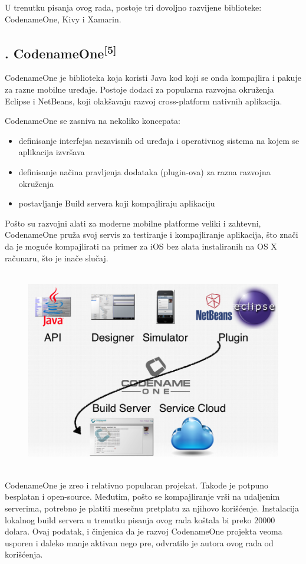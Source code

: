 \documentclass[a4paper]{article}
\newcommand\liststyleLii{%
\renewcommand\labelitemi{•}
\renewcommand\labelitemii{◦}
\renewcommand\labelitemiii{${\blacksquare}$}
\renewcommand\labelitemiv{•}
}
\begin{document}
U trenutku pisanja ovog rada, postoje tri dovoljno razvijene biblioteke:
CodenameOne, Kivy i Xamarin.

\subsection[3.1. CodenameOne[5{]}]{.
CodenameOne\textsuperscript{[5]}}
\hypertarget{RefHeadingToc1071308303690}{}CodenameOne je biblioteka koja
koristi Java kod koji se onda kompajlira i pakuje za razne mobilne
uređaje. Postoje dodaci za popularna razvojna okruženja Eclipse i
NetBeans, koji olakšavaju razvoj cross-platform nativnih aplikacija.

CodenameOne se zasniva na nekoliko koncepata:

\liststyleLii
\begin{itemize}
\item definisanje interfejsa nezavisnih od uređaja i operativnog sistema
na kojem se aplikacija izvršava
\item definisanje načina pravljenja dodataka (plugin-ova) za razna
razvojna okruženja
\item postavljanje Build servera koji kompajliraju aplikaciju
\end{itemize}
Pošto su razvojni alati za moderne mobilne platforme veliki i zahtevni,
CodenameOne pruža svoj servis za testiranje i kompajliranje aplikacija,
što znači da je moguće kompajlirati na primer za iOS bez alata
instaliranih na OS X računaru, što je inače slučaj.



\begin{figure}
\centering
\includegraphics[width=127.04mm,height=88.14mm]{msc-img8.png}
\end{figure}
\clearpage
CodenameOne je zreo i relativno popularan projekat. Takođe je potpuno
besplatan i open-source. Međutim, pošto se kompajliranje vrši na
udaljenim serverima, potrebno je platiti mesečnu pretplatu za njihovo
korišćenje. Instalacija lokalnog build servera u trenutku pisanja ovog
rada koštala bi preko 20000 dolara. Ovaj podatak, i činjenica da je
razvoj CodenameOne projekta veoma usporen i daleko manje aktivan nego
pre, odvratilo je autora ovog rada od korišćenja.
\end{document}
